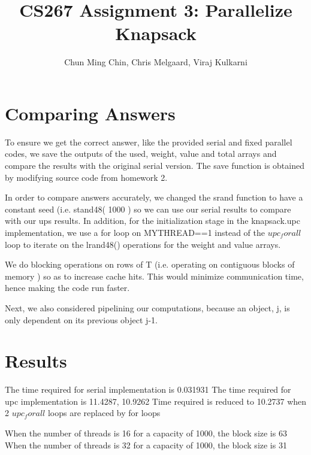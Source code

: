 \documentclass[11pt]{amsart}
\title{CS267 Assignment 3: Parallelize Knapsack}
\author{Chun Ming Chin, Chris Melgaard, Viraj Kulkarni }
\begin{document}
\maketitle




\section{Comparing Answers}

To ensure we get the correct answer, like the provided serial and fixed parallel codes, we save the outputs of the used, weight, value and total arrays and compare the results with the original serial version. The save function is obtained by modifying source code from homework 2.

In order to compare answers accurately, we changed the srand function to have a constant seed (i.e. stand48( 1000 ) so we can use our serial results to compare with our ups results. In addition, for the initialization stage in the knapsack.upc implementation, we use a for loop on MYTHREAD==1 instead of the $upc_forall$ loop to iterate on the lrand48() operations for the weight and value arrays. 

We do blocking operations on rows of T (i.e. operating on contiguous blocks of memory )  so as to increase cache hits. This would minimize communication time, hence making the code run faster. 

Next, we also considered pipelining our computations, because an object, j, is only dependent on its previous object j-1.

\section{Results}

The time required for serial implementation is 0.031931
The time required for upc implementation is 11.4287, 10.9262
Time required is reduced to 10.2737 when 2 $upc_forall$ loops are replaced by for loops 

When the number of threads is 16 for a capacity of 1000, the block size is 63
When the number of threads is 32 for a capacity of 1000, the block size is 31
\end{document}
